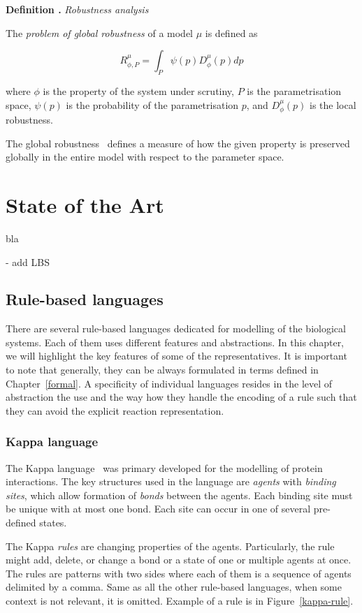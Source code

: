 \documentclass[11pt,a4paper]{report}
\newcounter{counter}[section]
\renewcommand{\thecounter}{\thechapter.\arabic{counter}}
\newenvironment{definition}[1]{\bigskip\refstepcounter{counter}\noindent\textbf{Definition \thecounter } \emph{#1} \par\nopagebreak\noindent \begin{itshape}}{\end{itshape}\bigskip}
\begin{document}
\begin{definition}{Robustness analysis}
The \emph{problem of global robustness} of a model $\mu$ is defined as 

$$ R^{\mu}_{\phi, P} = \int_{P} \psi(p) D^{\mu}_{\phi}(p) dp $$

where $\phi$ is the property of the system under scrutiny, $P$ is the parametrisation space, $\psi(p)$ is the probability of the parametrisation $p$, and $D^{\mu}_{\phi}(p)$ is the local robustness.
\end{definition}

The global robustness~\cite{kitano2007towards} defines a measure of how the given property is preserved globally in the entire model with respect to the parameter space.

\chapter{State of the Art} \label{chap:state}
 bla

 - add LBS

\section{Rule-based languages}
\label{rule_based_languages}

There are several rule-based languages dedicated for modelling of the biological systems. Each of them uses different features and abstractions. In this chapter, we will highlight the key features of some of the representatives. It is important to note that generally, they can be always formulated in terms defined in Chapter~\ref{formal}. A specificity of individual languages resides in the level of abstraction the use and the way how they handle the encoding of a rule such that they can avoid the explicit reaction representation.

\subsection{Kappa language}
\label{kappa}

The Kappa language~\cite{kappa_formal} was primary developed for the modelling of protein interactions. The key structures used in the language are \emph{agents} with \emph{binding sites}, which allow formation of \emph{bonds} between the agents. Each binding site must be unique with at most one bond. Each site can occur in one of several pre-defined states.

The Kappa \emph{rules} are changing properties of the agents. Particularly, the rule might add, delete, or change a bond or a state of one or multiple agents at once. The rules are patterns with two sides where each of them is a sequence of agents delimited by a comma. Same as all the other rule-based languages, when some context is not relevant, it is omitted. Example of a rule is in Figure~\ref{kappa-rule}.
\end{document}
